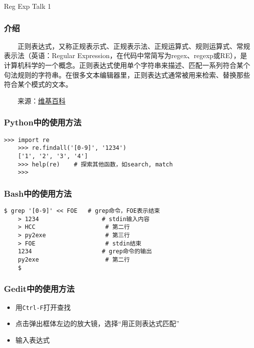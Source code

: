 



\PreFirstFrame
\begin{frame} [fragile]
	\centerline{\fontsize{42}{42}\selectfont Reg Exp Talk 1}
\end{frame}
\PostFirstFrame

\begin{frame} [fragile]
	\frametitle{介绍}
	\linespread{1.5}
	　　正则表达式，又称正规表示式、正规表示法、正规运算式、规则运算式、常规表示法（英语：Regular Expression，在代码中常简写为regex、regexp或RE），是计算机科学的一个概念。正则表达式使用单个字符串来描述、匹配一系列符合某个句法规则的字符串。在很多文本编辑器里，正则表达式通常被用来检索、替换那些符合某个模式的文本。
	
	　　来源：\href{https://zh.wikipedia.org/wiki/\%E6\%AD\%A3\%E5\%88\%99\%E8\%A1\%A8\%E8\%BE\%BE\%E5\%BC\%8F}{维基百科}
\end{frame}

\begin{frame} [fragile]
	\frametitle{Python中的使用方法}
	\linespread{1.5}
	\begin{lstlisting}[style=pythonstyle, gobble=4, texcl]
	>>> import re
	>>> re.findall('[0-9]', '1234')
	['1', '2', '3', '4']
	>>> help(re)	# 探索其他函数，如search, match
	>>>
	\end{lstlisting}
\end{frame}

\begin{frame} [fragile]
	\frametitle{Bash中的使用方法}
	\linespread{1.5}
	\begin{lstlisting}[style=bashstyle, gobble=4, texcl]
	$ grep '[0-9]' << FOE	# grep命令，FOE表示结束
	> 1234					# stdin输入内容
	> HCC					 # 第二行
	> py2exe				 # 第三行
	> FOE					 # stdin结束
	1234					# grep命令的输出
	py2exe					 # 第二行
	$
	\end{lstlisting}
\end{frame}

\begin{frame} [fragile]
	\frametitle{Gedit中的使用方法}
	\linespread{1.5}
	\begin{itemize}
	\item 用\texttt{Ctrl-F}打开查找
	\item 点击弹出框体左边的放大镜，选择``用正则表达式匹配''
	\item 输入表达式
	\end{itemize}
\end{frame}

